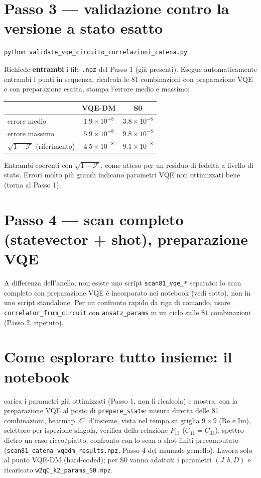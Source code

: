 \documentclass[11pt,a4paper]{article}
\begin{document}
\section*{Passo 3 --- validazione contro la versione a stato esatto}

\begin{verbatim}
python validate_vqe_circuito_correlazioni_catena.py
\end{verbatim}
Richiede \textbf{entrambi} i file \texttt{.npz} del Passo 1 (già presenti). Esegue
automaticamente entrambi i punti in sequenza, ricalcola le 81 combinazioni con preparazione VQE
e con preparazione esatta, stampa l'errore medio e massimo:
\begin{center}
\begin{tabular}{lcc}
\toprule
& VQE-DM & S0 \\
\midrule
errore medio & $1.9\times10^{-8}$ & $3.8\times10^{-8}$ \\
errore massimo & $5.9\times10^{-8}$ & $9.8\times10^{-8}$ \\
$\sqrt{1-\mathcal F}$ (riferimento) & $4.5\times10^{-8}$ & $9.1\times10^{-8}$ \\
\bottomrule
\end{tabular}
\end{center}
Entrambi coerenti con $\sqrt{1-\mathcal F}$, come atteso per un residuo di fedeltà a livello di
stato. Errori molto più grandi indicano parametri VQE non ottimizzati bene (torna al Passo 1).

\section*{Passo 4 --- scan completo (statevector + shot), preparazione VQE}

A differenza dell'anello, non esiste uno script \texttt{scan81\_vqe\_*} separato: lo scan
completo con preparazione VQE è incorporato nei notebook (vedi sotto), non in uno script
standalone. Per un confronto rapido da riga di comando, usare \texttt{correlator\_from\_circuit}
con \texttt{ansatz\_params} in un ciclo sulle $81$ combinazioni (Passo 2, ripetuto).

\section*{Come esplorare tutto insieme: il notebook}

\texttt{} carica i parametri già
ottimizzati (Passo 1, non li ricalcola) e mostra, con la preparazione VQE al posto di
\texttt{prepare\_state}: misura diretta delle 81 combinazioni, heatmap $|C|$ d'insieme, vista
nel tempo su griglia $9\times9$ (Re e Im), selettore per ispezione singola, verifica della
relazione $P_{13}$ ($C_{11}=C_{33}$), spettro dietro un caso ricco/piatto, confronto con lo scan
a shot finiti precomputato (\texttt{scan81\_catena\_vqedm\_results.npz}, Passo 4 del manuale
gemello). Lavora solo al punto VQE-DM (hard-coded); per S0 vanno adattati i parametri
$(J,b,D)$ e ricaricato \texttt{w2qC\_k2\_params\_S0.npz}.
\end{document}
